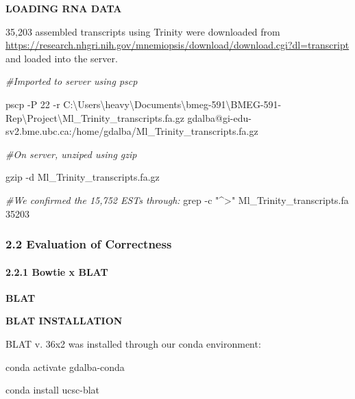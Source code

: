 \documentclass[
]{article}
\newenvironment{Shaded}{\begin{snugshade}}{\end{snugshade}}
\newcommand{\CommentTok}[1]{\textcolor[rgb]{0.56,0.35,0.01}{\textit{#1}}}
\newcommand{\ExtensionTok}[1]{#1}
\newcommand{\FunctionTok}[1]{\textcolor[rgb]{0.00,0.00,0.00}{#1}}
\newcommand{\NormalTok}[1]{#1}
\newcommand{\StringTok}[1]{\textcolor[rgb]{0.31,0.60,0.02}{#1}}
\begin{document}
\textbf{LOADING RNA DATA}

35,203 assembled transcripts using Trinity were downloaded from
\url{https://research.nhgri.nih.gov/mnemiopsis/download/download.cgi?dl=transcript}
and loaded into the server.

\begin{Shaded}
\begin{Highlighting}[]

\CommentTok{\#Imported to server using pscp}

\ExtensionTok{pscp}\NormalTok{ {-}P 22 {-}r C:\textbackslash{}Users\textbackslash{}heavy\textbackslash{}Documents\textbackslash{}bmeg{-}591\textbackslash{}BMEG{-}591{-}Rep\textbackslash{}Project\textbackslash{}Ml\_Trinity\_transcripts.fa.gz gdalba@gi{-}edu{-}sv2.bme.ubc.ca:/home/gdalba/Ml\_Trinity\_transcripts.fa.gz}

\CommentTok{\#On server, unziped using gzip}

\FunctionTok{gzip}\NormalTok{ {-}d Ml\_Trinity\_transcripts.fa.gz}

\CommentTok{\#We confirmed the 15,752 ESTs through:}
\FunctionTok{grep}\NormalTok{ {-}c }\StringTok{"\^{}\textgreater{}"}\NormalTok{ Ml\_Trinity\_transcripts.fa}
\ExtensionTok{35203}
\end{Highlighting}
\end{Shaded}

\hypertarget{evaluation-of-correctness}{%
\subsubsection{2.2 Evaluation of
Correctness}\label{evaluation-of-correctness}}

\hypertarget{bowtie-x-blat}{%
\paragraph{2.2.1 Bowtie x BLAT}\label{bowtie-x-blat}}

\textbf{BLAT}

\textbf{BLAT INSTALLATION}

BLAT v. 36x2 was installed through our conda environment:

\begin{Shaded}
\begin{Highlighting}[]

\ExtensionTok{conda}\NormalTok{ activate gdalba{-}conda}

\ExtensionTok{conda}\NormalTok{ install ucsc{-}blat}
\end{Highlighting}
\end{Shaded}
\end{document}
